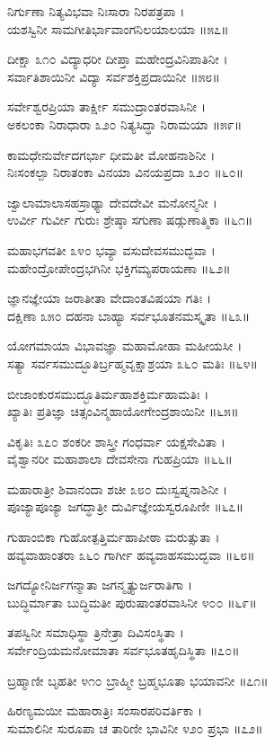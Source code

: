 ನಿರ್ಗುಣಾ ನಿತ್ಯವಿಭವಾ ನಿಃಸಾರಾ ನಿರಪತ್ರಪಾ ।\\
ಯಶಸ್ವಿನೀ ಸಾಮಗೀತಿರ್ಭಾವಾಂಗನಿಲಯಾಲಯಾ ॥೫೭॥

ದೀಕ್ಷಾ ೩೧೦ ವಿದ್ಯಾಧರೀ ದೀಪ್ತಾ ಮಹೇಂದ್ರವಿನಿಪಾತಿನೀ ।\\
ಸರ್ವಾತಿಶಾಯಿನೀ ವಿದ್ಯಾ ಸರ್ವಶಕ್ತಿಪ್ರದಾಯಿನೀ ॥೫೮॥

ಸರ್ವೇಶ್ವರಪ್ರಿಯಾ ತಾರ್ಕ್ಷೀ ಸಮುದ್ರಾಂತರವಾಸಿನೀ ।\\
ಅಕಲಂಕಾ ನಿರಾಧಾರಾ ೩೨೦ ನಿತ್ಯಸಿದ್ಧಾ ನಿರಾಮಯಾ ॥೫೯॥

ಕಾಮಧೇನುರ್ವೇದಗರ್ಭಾ ಧೀಮತೀ ಮೋಹನಾಶಿನೀ ।\\
ನಿಃಸಂಕಲ್ಪಾ ನಿರಾತಂಕಾ ವಿನಯಾ ವಿನಯಪ್ರದಾ ೩೨೦ ॥೬೦॥

ಜ್ವಾಲಾಮಾಲಾಸಹಸ್ರಾಢ್ಯಾ ದೇವದೇವೀ ಮನೋನ್ಮನೀ ।\\
ಉರ್ವೀ ಗುರ್ವೀ ಗುರುಃ ಶ್ರೇಷ್ಠಾ ಸಗುಣಾ ಷಡ್ಗುಣಾತ್ಮಿಕಾ ॥೬೧॥

ಮಹಾಭಗವತೀ ೩೪೦ ಭವ್ಯಾ ವಸುದೇವಸಮುದ್ಭವಾ ।\\
ಮಹೇಂದ್ರೋಪೇಂದ್ರಭಗಿನೀ ಭಕ್ತಿಗಮ್ಯಪರಾಯಣಾ ॥೬೨॥

ಜ್ಞಾನಜ್ಞೇಯಾ ಜರಾತೀತಾ ವೇದಾಂತವಿಷಯಾ ಗತಿಃ ।\\
ದಕ್ಷಿಣಾ ೩೫೦ ದಹನಾ ಬಾಹ್ಯಾ ಸರ್ವಭೂತನಮಸ್ಕೃತಾ ॥೬೩॥

ಯೋಗಮಾಯಾ ವಿಭಾವಜ್ಞಾ ಮಹಾಮೋಹಾ ಮಹೀಯಸೀ ।\\
ಸತ್ಯಾ ಸರ್ವಸಮುದ್ಭೂತಿರ್ಬ್ರಹ್ಮವೃಕ್ಷಾಶ್ರಯಾ ೩೬೦ ಮತಿಃ ॥೬೪॥

ಬೀಜಾಂಕುರಸಮುದ್ಭೂತಿರ್ಮಹಾಶಕ್ತಿರ್ಮಹಾಮತಿಃ ।\\
ಖ್ಯಾತಿಃ ಪ್ರತಿಜ್ಞಾ ಚಿತ್ಸಂವಿನ್ಮಹಾಯೋಗೇಂದ್ರಶಾಯಿನೀ ॥೬೫॥

ವಿಕೃತಿಃ ೩೭೦ ಶಂಕರೀ ಶಾಸ್ತ್ರೀ ಗಂಧರ್ವಾ ಯಕ್ಷಸೇವಿತಾ ।\\
ವೈಶ್ವಾನರೀ ಮಹಾಶಾಲಾ ದೇವಸೇನಾ ಗುಹಪ್ರಿಯಾ ॥೬೬॥

ಮಹಾರಾತ್ರೀ ಶಿವಾನಂದಾ ಶಚೀ ೩೮೦ ದುಃಸ್ವಪ್ನನಾಶಿನೀ ।\\
ಪೂಜ್ಯಾಪೂಜ್ಯಾ ಜಗದ್ಧಾತ್ರೀ ದುರ್ವಿಜ್ಞೇಯಸ್ವರೂಪಿಣೀ ॥೬೭॥

ಗುಹಾಂಬಿಕಾ ಗುಹೋತ್ಪತ್ತಿರ್ಮಹಾಪೀಠಾ ಮರುತ್ಸುತಾ ।\\
ಹವ್ಯವಾಹಾಂತರಾ ೩೬೦ ಗಾರ್ಗೀ ಹವ್ಯವಾಹಸಮುದ್ಭವಾ ॥೬೮॥

ಜಗದ್ಯೋನಿರ್ಜಗನ್ಮಾತಾ ಜಗನ್ಮೃತ್ಯುರ್ಜರಾತಿಗಾ ।\\
ಬುದ್ಧಿರ್ಮಾತಾ ಬುದ್ಧಿಮತೀ ಪುರುಷಾಂತರವಾಸಿನೀ ೪೦೦ ॥೬೯॥

ತಪಸ್ವಿನೀ ಸಮಾಧಿಸ್ಥಾ ತ್ರಿನೇತ್ರಾ ದಿವಿಸಂಸ್ಥಿತಾ ।\\
ಸರ್ವೇಂದ್ರಿಯಮನೋಮಾತಾ ಸರ್ವಭೂತಹೃದಿಸ್ಥಿತಾ ॥೭೦॥

ಬ್ರಹ್ಮಾಣೀ ಬೃಹತೀ ೪೧೦ ಬ್ರಾಹ್ಮೀ ಬ್ರಹ್ಮಭೂತಾ ಭಯಾವನೀ ॥೭೧॥

ಹಿರಣ್ಯಮಯೀ ಮಹಾರಾತ್ರಿಃ ಸಂಸಾರಪರಿವರ್ತಿಕಾ ।\\
ಸುಮಾಲಿನೀ ಸುರೂಪಾ ಚ ತಾರಿಣೀ ಭಾವಿನೀ ೪೨೦ ಪ್ರಭಾ ॥೭೨॥

